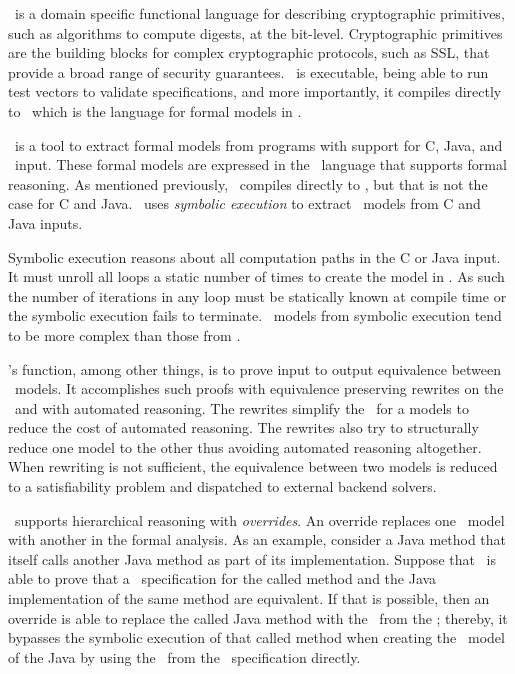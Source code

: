 \cryptol\ is a domain specific functional language for describing cryptographic primitives, such as algorithms to compute digests, at the bit-level.
Cryptographic primitives are the building blocks for complex cryptographic protocols, such as SSL, that provide a broad range of security guarantees.
\cryptol\ is executable, being able to run test vectors to validate specifications, and more importantly, it compiles directly to \sawcore\ which is the language for formal models in \saw.

\saw\ is a tool to extract formal models from programs with support for C, Java, and \cryptol\ input.
These formal models are expressed in the \sawcore\ language that supports formal reasoning.
As mentioned previously, \cryptol\ compiles directly to \sawcore, but that is not the case for C and Java.
\saw\ uses \emph{symbolic execution} to extract \sawcore\ models from C and Java inputs.

Symbolic execution reasons about all computation paths in the C or Java input.
It must unroll all loops a static number of times to create the model in \sawcore.
As such the number of iterations in any loop must be statically known at compile time or the symbolic execution fails to terminate.
\sawcore\ models from symbolic execution tend to be more complex than those from \cryptol.

\saw's function, among other things, is to prove input to output equivalence between \sawcore\ models.
It accomplishes such proofs with equivalence preserving rewrites on the \sawcore\ and with automated reasoning.
The rewrites simplify the \sawcore\ for a models to reduce the cost of automated reasoning. 
The rewrites also try to structurally reduce one model to the other thus avoiding automated reasoning altogether.
When rewriting is not sufficient, the equivalence between two models is reduced to a satisfiability problem and dispatched to external backend solvers.

\saw\ supports hierarchical reasoning with \emph{overrides}.
An override replaces one \sawcore\ model with another in the formal analysis.
As an example, consider a Java method that itself calls another Java method as part of its implementation.
Suppose that \saw\ is able to prove that a \cryptol\ specification for the called method and the Java implementation of the same method are equivalent.
If that is possible, then an override is able to replace the called Java method with the \sawcore\ from the \cryptol;
thereby, it bypasses the symbolic execution of that called method when creating the \sawcore\ model of the Java by using the \sawcore\ from the \cryptol\ specification directly.

